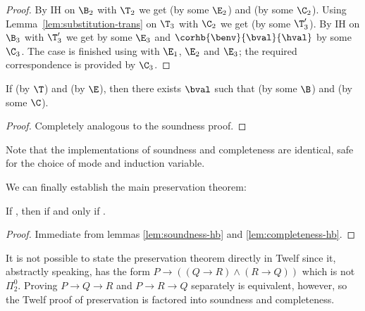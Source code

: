 \begin{proof}
By IH on $\B_2$ with $\T_2$ we get  (by some $\E_2$) and  (by some $\C_2$).
Using Lemma~\ref{lem:substitution-trans} on $\T_3$ with $\C_2$ we get  (by some $\T_3'$).
By IH on $\B_3$ with $\T_3'$ we get  by some $\E_3$ and $\corhb{\benv}{\bval}{\hval}$ by some $\C_3$.
The case is finished using  with $\E_1$, $\E_2$ and $\E_3$; the required correspondence is provided by $\C_3$.

\end{proof}

\begin{lemma}[Completeness]
\label{lem:completeness-hb}
If \trahb{\benv}{\envnil}{\hexp}{\bexp} (by $\T$) and \hev{\hexp}{\hval} (by $\E$), then there exists $\bval$ such that \bev{\benv}{\bexp}{\bval} (by some $\B$) and \corhb{\benv}{\bval}{\hval} (by some $\C$).
\end{lemma}


\begin{proof}
Completely analogous to the soundness proof.
\end{proof}

\Twelf
Note that the implementations of soundness and completeness are identical, safe for the choice of mode and induction variable.

\vspace{0.5cm}

\noindent We can finally establish the main preservation theorem:

\begin{theorem}
\label{thm:preservation-hb} If \trahb{\envnil}{\envnil}{\bexp}{\hexp}, then \hev{\hexp}{\n{\nat}} if and only if \bev{\envnil}{\bexp}{\n{\nat}}.
\end{theorem}


\begin{proof}
Immediate from lemmas \ref{lem:soundness-hb} and \ref{lem:completeness-hb}.
\end{proof}

\Twelf
It is not possible to state the preservation theorem directly in Twelf since it, abstractly speaking, has the form $P \rightarrow ((Q \rightarrow R) \wedge (R \rightarrow Q))$ which is not $\Pi_2^0$.
Proving $P \rightarrow Q \rightarrow R$ and $P \rightarrow R \rightarrow Q$ separately is equivalent, however, so the Twelf proof of preservation is factored into soundness and completeness.


